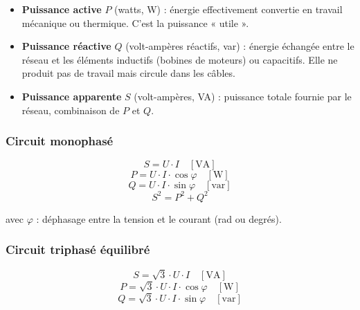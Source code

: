 \begin{definition}
  \begin{itemize}
    \item \textbf{Puissance active} $P$ (watts, W) : énergie effectivement convertie en travail mécanique ou thermique. C'est la puissance « utile ».
    \item \textbf{Puissance réactive} $Q$ (volt-ampères réactifs, var) : énergie échangée entre le réseau et les éléments inductifs (bobines de moteurs) ou capacitifs. Elle ne produit pas de travail mais circule dans les câbles.
    \item \textbf{Puissance apparente} $S$ (volt-ampères, VA) : puissance totale fournie par le réseau, combinaison de $P$ et $Q$.
  \end{itemize}
\end{definition}

\subsubsection{Circuit monophasé}

\begin{equation}
  S = U \cdot I \quad [\text{VA}]
\end{equation}
\begin{equation}
  P = U \cdot I \cdot \cos\varphi \quad [\text{W}]
\end{equation}
\begin{equation}
  Q = U \cdot I \cdot \sin\varphi \quad [\text{var}]
\end{equation}
\begin{equation}
  S^2 = P^2 + Q^2
\end{equation}

avec $\varphi$ : déphasage entre la tension et le courant (rad ou degrés).

\subsubsection{Circuit triphasé équilibré}

\begin{equation}
  S = \sqrt{3} \cdot U \cdot I \quad [\text{VA}]
\end{equation}
\begin{equation}
  P = \sqrt{3} \cdot U \cdot I \cdot \cos\varphi \quad [\text{W}]
\end{equation}
\begin{equation}
  Q = \sqrt{3} \cdot U \cdot I \cdot \sin\varphi \quad [\text{var}]
\end{equation}

